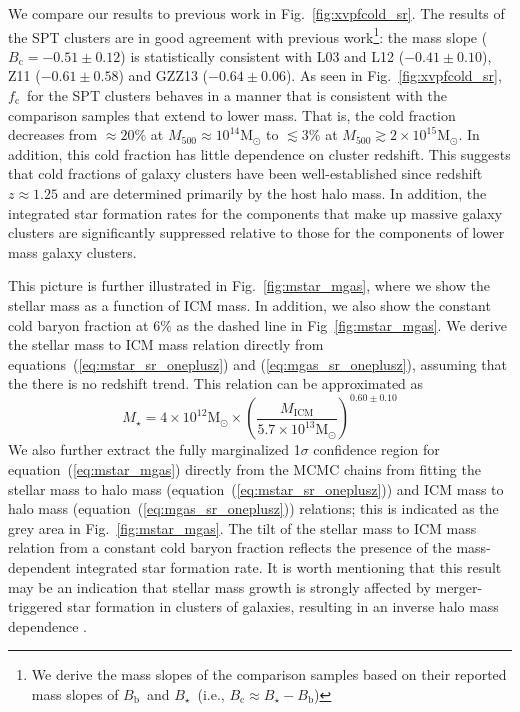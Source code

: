 \documentclass[useAMS,usenatbib,iop,numberedappendix]{mn2e}
\newcommand{\Msun}{\ensuremath{\mathrm{M}_{\odot}}}
\newcommand{\Mfiveoo}{\ensuremath{M_{500}}}
\newcommand{\redshift}{\ensuremath{z}}
\newcommand{\Mstar}{\ensuremath{M_{\star}}}
\newcommand{\Mgas}{\ensuremath{M_{\mathrm{ICM}}}}
\newcommand{\Bbary}{\ensuremath{B_{\mathrm{b}}}}
\newcommand{\Bcold}{\ensuremath{B_{\mathrm{c}}}}
\newcommand{\Bstar}{\ensuremath{B_{\star}}}
\newcommand{\fcold}{\ensuremath{f_{\mathrm{c}}}}
\newcommand{\percent}{\ensuremath{\%}}
\newcommand{\numBcoldonez}{\ensuremath{-0.51\pm0.12}}
\begin{document}
We compare our results to previous work in Fig.~\ref{fig:xvpfcold_sr}.
The results of the SPT clusters are in good agreement with previous work\footnote{We derive the mass slopes of the comparison samples based on their reported mass slopes of \Bbary\ and \Bstar\ (i.e., $\Bcold\approx\Bstar - \Bbary$)}: the mass slope ($\Bcold=\numBcoldonez$) is statistically consistent with L03 and L12 ($-0.41\pm0.10$), Z11 ($-0.61\pm0.58$) and GZZ13 ($-0.64\pm0.06$). 
As seen in Fig.~\ref{fig:xvpfcold_sr}, \fcold\ for the SPT clusters behaves in a manner that is consistent with the comparison samples that extend to lower mass.  That is, the cold fraction decreases from $\approx20\percent$ at $\Mfiveoo\approx10^{14}\Msun$ to $\lesssim3\percent$ at $\Mfiveoo\gtrsim2\times10^{15}\Msun$.
In addition, this cold fraction has little dependence on cluster redshift.
This suggests that cold fractions of galaxy clusters have been well-established since redshift $\redshift\approx1.25$ and are determined primarily by the host halo mass.  
In addition, the integrated star formation rates for the components that make up massive galaxy clusters are significantly suppressed relative to those for the components of lower mass galaxy clusters.


This picture is further illustrated in Fig.~\ref{fig:mstar_mgas}, where we show the stellar mass as a function of ICM mass.
In addition, we also show the constant cold baryon fraction at $6\percent$ as the dashed line in Fig~\ref{fig:mstar_mgas}.
We derive the stellar mass to ICM mass relation directly from equations~(\ref{eq:mstar_sr_oneplusz}) and (\ref{eq:mgas_sr_oneplusz}), assuming that the there is no redshift trend.  This relation can be approximated as
%
\begin{equation}
\label{eq:mstar_mgas}
\Mstar = 4\times10^{12}\Msun\times\left(  \frac{\Mgas}{5.7\times10^{13}\Msun}\right)^{0.60\pm0.10}
\end{equation}
%
We also further extract the fully marginalized 1$\sigma$ confidence region for equation~(\ref{eq:mstar_mgas}) directly from the MCMC chains from fitting the stellar mass to halo mass (equation~(\ref{eq:mstar_sr_oneplusz})) and ICM mass to halo mass (equation~(\ref{eq:mgas_sr_oneplusz})) relations;  this is indicated as the grey area in Fig.~\ref{fig:mstar_mgas}.
The tilt of the stellar mass to ICM mass relation from a constant cold baryon fraction reflects the presence of the mass-dependent integrated star formation rate.
It is worth mentioning that this result may be an indication that stellar mass growth is strongly affected by merger-triggered star formation in clusters of galaxies, resulting in an inverse halo mass dependence \citep[e.g.,][]{brodwin13}.
\end{document}
